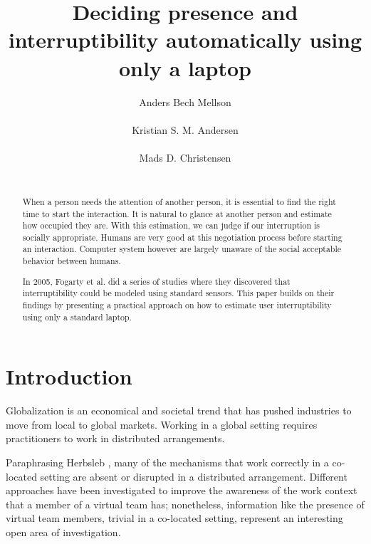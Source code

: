 \documentclass{sigchi}
\begin{document}


\title{Deciding presence and interruptibility automatically using only a laptop}
\author{
  \alignauthor Anders Bech Mellson\\
    \\
  \alignauthor Kristian S. M. Andersen\\
    \\
  \alignauthor Mads D. Christensen\\
    \\
}

\maketitle

\begin{abstract}
When a person needs the attention of another person, it is essential to find the right time to start the interaction.
It is natural to glance at another person and estimate how occupied they are. With this estimation, we can judge if our interruption is socially appropriate.
Humans are very good at this negotiation process before starting an interaction.
Computer system however are largely unaware of the social acceptable behavior between humans.

In 2005, Fogarty et al. did a series of studies where they discovered that interruptibility could be modeled using standard sensors.
This paper builds on their findings by presenting a practical approach on how to estimate user interruptibility using only a standard laptop.

\end{abstract}



\section{Introduction}
Globalization is an economical and societal trend that has pushed industries to move from local to global markets.
Working in a global setting requires practitioners to work in distributed arrangements.

Paraphrasing Herbsleb \cite{herbsleb2007}, many of the mechanisms that work correctly in a co-located setting are absent or disrupted in a distributed arrangement.
Different approaches \cite{bly1993media} \cite{fogarty2004myvine} \cite{hincapie2011design} \cite{lai2003myteam} \cite{want1992active} have been investigated to improve the awareness of the work context that a member of a virtual team has; nonetheless, information like the presence of virtual team members, trivial in a co-located setting, represent an interesting open area of investigation.
\end{document}
